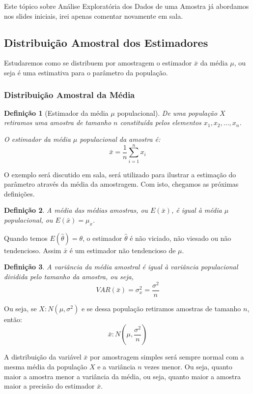 \documentclass[oneside,a4paper,12pt]{article}
\newtheorem{definition}{Definição}[section]
\begin{document}
Este tópico sobre Análise Exploratória dos Dados de uma Amostra já abordamos nos slides iniciais, irei apenas comentar novamente em sala.

\subsection{Distribuição Amostral dos Estimadores}

Estudaremos como se distribuem por amostragem o estimador $\bar{x}$ da média $\mu$, ou seja é uma estimativa para o parâmetro da população.

\subsubsection{Distribuição Amostral da Média}
\begin{definition}[Estimador da média $\mu$ populacional]
	De uma população $X$ retiramos uma amostra de tamanho $n$ constituída pelos elementos $x_1,x_2,\dots,x_n$.
	
	O estimador da média $\mu$ populacional da amostra é:
	$$\bar{x} = \displaystyle \frac{1}{n}\sum_{i=1}^{n}x_i$$
\end{definition}

O exemplo será discutido em sala, será utilizado para ilustrar a estimação do parâmetro através da média da amostragem. Com isto, chegamos as próximas definições.

\begin{definition}
	A média das médias amostras, ou $E(\bar{x})$, é igual à média $\mu$ populacional, ou $E(\bar{x}) = \mu_x$.
\end{definition}

Quando temos $E(\hat{\theta}) = \theta$, o estimador $\hat{\theta}$ é não viciado, não viesado ou não tendencioso. Assim $\bar{x}$ é um estimador não tendencioso de $\mu$.

\begin{definition}
	A variância da média amostral é igual à variância populacional dividida pelo tamanho da amostra, ou seja,
	$$VAR(\bar{x}) = \sigma_x^2 = \displaystyle \frac{\sigma^2}{n}$$
\end{definition}

Ou seja, se $X:N(\mu,\sigma^2)$ e se dessa população retiramos amostras de tamanho $n$, então:
$$\bar{x}:N\left( \mu, \displaystyle \frac{\sigma^2}{n} \right)$$

A distribuição da variável $\bar{x}$ por amostragem simples será sempre normal com a mesma média da população $X$ e a variância $n$ vezes menor. Ou seja, quanto maior a amostra menor a variância da média, ou seja, quanto maior a amostra maior a precisão do estimador $\bar{x}$.
\end{document}
